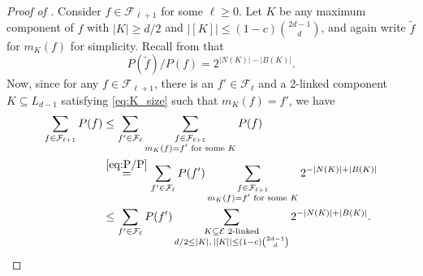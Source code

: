 \documentclass{amsart}
\theoremstyle{definition}
\newcommand{\cE}{\mathcal{E} }
\newcommand{\cF}{\mathcal{F} }
\newcommand{\beq}[1]{\begin{equation}\label{#1}}
\newcommand{\enq}[0]{\end{equation}}
\newcommand{\0}[0]{\emptyset}
\begin{document}
\begin{proof}[Proof of ]
Consider $f\in\cF_{\ell+1}$ for some $\ell \ge 0$. Let $K$ be any maximum component of $f$ with $|K|\geq d/2$ and $|[K]|\leq (1-c)\binom{2d-1}{d}$, and again write $\widetilde f$ for $m_K(f)$ for simplicity. 
Recall from  that
\beq{eq:P/P} 
P(\widetilde f)/P(f)= 2^{|N(K)|-|B(K)|}.
\enq
Now, since for any $f \in \cF_{\ell+1}$, there is an $f' \in \cF_\ell$ and a 2-linked component $K\subseteq L_{d-1}$ satisfying \eqref{eq:K_size} such that $m_K(f)=f'$, we have
    \begin{align*}
        \sum_{f\in\cF_{\ell+1}}P(f)&\leq \sum_{f'\in \cF_\ell }\sum_{\substack{f\in\cF_{\ell+1}\\m_K(f)=f'\text{ for some $K$} }}P(f)\\
        &\stackrel{\eqref{eq:P/P}}{=}\sum_{f'\in \cF_\ell } P(f') \sum_{\substack{f\in\cF_{\ell+1}\\m_K(f)=f'\text{ for some $K$}  }} 2^{-|N(K)|+|B(K)|}\\
        &\leq \sum_{f'\in \cF_\ell } P(f') \sum_{\substack{K\subseteq\cE\text{ 2-linked}\\d/2\leq |K|,\,|[K]|\leq (1-c)\binom{2d-1}{d}}}2^{-|N(K)|+|B(K)|}.
    \end{align*}


\end{proof}
\end{document}
